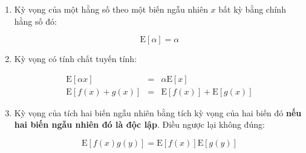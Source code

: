 \documentclass[../main-report.tex]{subfiles}
\begin{document}
\begin{enumerate}
\item Kỳ vọng của một hằng số theo một biến ngẫu nhiên \(x\) bất kỳ bằng chính hằng số đó:

\begin{equation}
\text{E}[\alpha] = \alpha
\end{equation}

\item Kỳ vọng có tính chất tuyến tính:

\begin{eqnarray}
  \text{E}[\alpha x] & = & \alpha \text{E}[x] \quad \\
  \text{E}[f(x) + g(x)] & = & \text{E}[f(x)] + \text{E}[g(x)]
\end{eqnarray}

\item Kỳ vọng của tích hai biến ngẫu nhiên bằng tích kỳ vọng của hai biến đó \textbf{nếu hai biến ngẫu nhiên đó là độc lập}. Điều ngược lại không đúng:

\begin{equation}
\text{E}[f(x) g(y)] = \text{E}[f(x)] \text{E}[g(y)]
\end{equation}

\end{enumerate}
%
%
%
\end{document}
